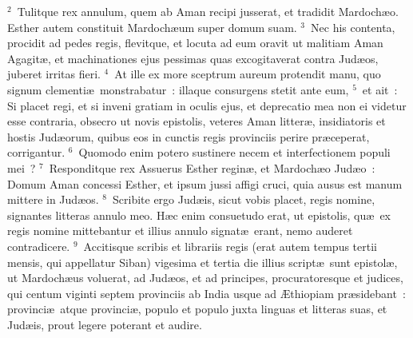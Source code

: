 ${}^{2}$~Tulitque rex annulum, quem ab Aman recipi jusserat, et tradidit Mardoch\ae o. Esther autem constituit Mardoch\ae um super domum suam.
${}^{3}$~Nec his contenta, procidit ad pedes regis, flevitque, et locuta ad eum oravit ut malitiam Aman Agagit\ae , et machinationes ejus pessimas quas excogitaverat contra Jud\ae os, juberet irritas fieri.
${}^{4}$~At ille ex more sceptrum aureum protendit manu, quo signum clementi\ae\ monstrabatur~: illaque consurgens stetit ante eum,
${}^{5}$~et ait~: Si placet regi, et si inveni gratiam in oculis ejus, et deprecatio mea non ei videtur esse contraria, obsecro ut novis epistolis, veteres Aman litter\ae , insidiatoris et hostis Jud\ae orum, quibus eos in cunctis regis provinciis perire pr\ae ceperat, corrigantur.
${}^{6}$~Quomodo enim potero sustinere necem et interfectionem populi mei~?
${}^{7}$~Responditque rex Assuerus Esther regin\ae , et Mardoch\ae o Jud\ae o~: Domum Aman concessi Esther, et ipsum jussi affigi cruci, quia ausus est manum mittere in Jud\ae os.
${}^{8}$~Scribite ergo Jud\ae is, sicut vobis placet, regis nomine, signantes litteras annulo meo. H\ae c enim consuetudo erat, ut epistolis, qu\ae\ ex regis nomine mittebantur et illius annulo signat\ae\ erant, nemo auderet contradicere.
${}^{9}$~Accitisque scribis et librariis regis (erat autem tempus tertii mensis, qui appellatur Siban) vigesima et tertia die illius script\ae\ sunt epistol\ae , ut Mardoch\ae us voluerat, ad Jud\ae os, et ad principes, procuratoresque et judices, qui centum viginti septem provinciis ab India usque ad \AE thiopiam pr\ae sidebant~: provinci\ae\ atque provinci\ae , populo et populo juxta linguas et litteras suas, et Jud\ae is, prout legere poterant et audire.


